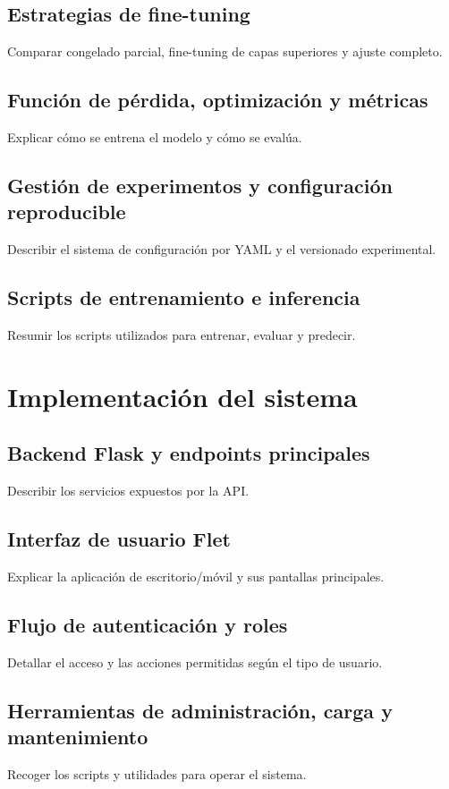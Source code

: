 \documentclass[11pt,spanish,listoffigures,listoftables]{tfgetsinf}
\begin{document}
\section{Estrategias de fine-tuning}
Comparar congelado parcial, fine-tuning de capas superiores y ajuste completo.

\section{Función de pérdida, optimización y métricas}
Explicar cómo se entrena el modelo y cómo se evalúa.

\section{Gestión de experimentos y configuración reproducible}
Describir el sistema de configuración por YAML y el versionado experimental.

\section{Scripts de entrenamiento e inferencia}
Resumir los scripts utilizados para entrenar, evaluar y predecir.

\chapter{Implementación del sistema}
\section{Backend Flask y endpoints principales}
Describir los servicios expuestos por la API.

\section{Interfaz de usuario Flet}
Explicar la aplicación de escritorio/móvil y sus pantallas principales.

\section{Flujo de autenticación y roles}
Detallar el acceso y las acciones permitidas según el tipo de usuario.

\section{Herramientas de administración, carga y mantenimiento}
Recoger los scripts y utilidades para operar el sistema.
\end{document}

